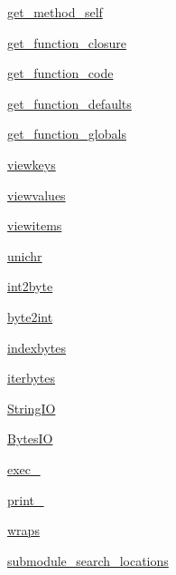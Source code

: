 \begin{DoxyCompactItemize}
\item 
\hyperlink{namespacepip_1_1__vendor_1_1six_a7a706fce78d0a52e27699ef3afbce4c6}{get\+\_\+method\+\_\+self}
\item 
\hyperlink{namespacepip_1_1__vendor_1_1six_ad8e48e44bf6aad77c53850e86b9cc7fe}{get\+\_\+function\+\_\+closure}
\item 
\hyperlink{namespacepip_1_1__vendor_1_1six_a17acaa7414baab0d305aaa49035fc80a}{get\+\_\+function\+\_\+code}
\item 
\hyperlink{namespacepip_1_1__vendor_1_1six_aa1042923a9e62d346dd8069a99502606}{get\+\_\+function\+\_\+defaults}
\item 
\hyperlink{namespacepip_1_1__vendor_1_1six_aefc2110f23769dd312f02f6ca7815abb}{get\+\_\+function\+\_\+globals}
\item 
\hyperlink{namespacepip_1_1__vendor_1_1six_ae44bf17204997792b815eaa7a6cdf655}{viewkeys}
\item 
\hyperlink{namespacepip_1_1__vendor_1_1six_acf8bb41f8993a22fb5640b372e86ef09}{viewvalues}
\item 
\hyperlink{namespacepip_1_1__vendor_1_1six_a77d6f279ea11cb2f14fa50678d10d61f}{viewitems}
\item 
\hyperlink{namespacepip_1_1__vendor_1_1six_abfe760c44692ad5205fcad5e8762271d}{unichr}
\item 
\hyperlink{namespacepip_1_1__vendor_1_1six_a0b3ff8776bf73e88ac5f331a6b4f6571}{int2byte}
\item 
\hyperlink{namespacepip_1_1__vendor_1_1six_a02d37590029143b59f8ea093be26b00a}{byte2int}
\item 
\hyperlink{namespacepip_1_1__vendor_1_1six_a2d42c210f329a826072a6cce8f60234c}{indexbytes}
\item 
\hyperlink{namespacepip_1_1__vendor_1_1six_a7acb8e4f83d9ae3db093c406919fa6c4}{iterbytes}
\item 
\hyperlink{namespacepip_1_1__vendor_1_1six_af611d8b4e269a94e75410970f5b9e5ac}{String\+IO}
\item 
\hyperlink{namespacepip_1_1__vendor_1_1six_a4e24ba4a552e2244b052f10ad4975620}{Bytes\+IO}
\item 
\hyperlink{namespacepip_1_1__vendor_1_1six_a4835e4b0f7296e9c943bfa4923651094}{exec\+\_\+}
\item 
\hyperlink{namespacepip_1_1__vendor_1_1six_ae2964bb48b12cab5c685f940b424cc61}{print\+\_\+}
\item 
\hyperlink{namespacepip_1_1__vendor_1_1six_ae8d7e51ee26fc5486e6e515f8292b005}{wraps}
\item 
\hyperlink{namespacepip_1_1__vendor_1_1six_a7bc9a209de976aadbc2869b99c99b215}{submodule\+\_\+search\+\_\+locations}
\end{DoxyCompactItemize}


